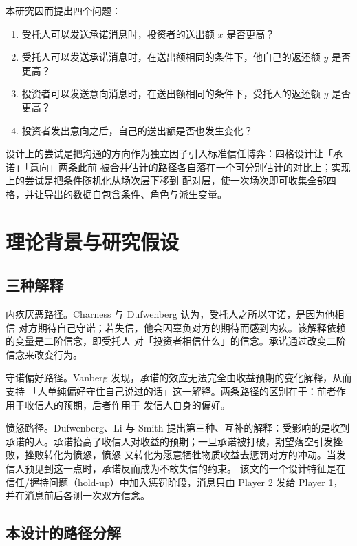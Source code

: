 \documentclass[10pt,a4paper]{ctexart}
\begin{document}
本研究因而提出四个问题：

\begin{enumerate}[label=RQ\arabic*., leftmargin=2.2em]
  \item 受托人可以发送承诺消息时，投资者的送出额 $x$ 是否更高？
  \item 受托人可以发送承诺消息时，在送出额相同的条件下，他自己的返还额 $y$ 是否更高？
  \item 投资者可以发送意向消息时，在送出额相同的条件下，受托人的返还额 $y$ 是否更高？
  \item 投资者发出意向之后，自己的送出额是否也发生变化？
\end{enumerate}

设计上的尝试是把沟通的方向作为独立因子引入标准信任博弈：四格设计让「承诺」「意向」两条此前
被合并估计的路径各自落在一个可分别估计的对比上；实现上的尝试是把条件随机化从场次层下移到
配对层，使一次场次即可收集全部四格，并让导出的数据自包含条件、角色与派生变量。

\section{理论背景与研究假设}

\subsection{三种解释}

内疚厌恶路径。Charness 与 Dufwenberg\cite{charness2006} 认为，受托人之所以守诺，是因为他相信
对方期待自己守诺；若失信，他会因辜负对方的期待而感到内疚。该解释依赖的变量是二阶信念，即受托人
对「投资者相信什么」的信念。承诺通过改变二阶信念来改变行为。

守诺偏好路径。Vanberg\cite{vanberg2008} 发现，承诺的效应无法完全由收益预期的变化解释，从而支持
「人单纯偏好守住自己说过的话」这一解释。两条路径的区别在于：前者作用于收信人的预期，后者作用于
发信人自身的偏好。

愤怒路径。Dufwenberg、Li 与 Smith\cite{dufwenberg2026} 提出第三种、互补的解释：受影响的是收到
承诺的人。承诺抬高了收信人对收益的预期；一旦承诺被打破，期望落空引发挫败，挫败转化为愤怒，愤怒
又转化为愿意牺牲物质收益去惩罚对方的冲动。当发信人预见到这一点时，承诺反而成为不敢失信的约束。
该文的一个设计特征是在信任/握持问题（hold-up）中加入惩罚阶段，消息只由 Player 2 发给 Player 1，
并在消息前后各测一次双方信念。

\subsection{本设计的路径分解}
\end{document}

